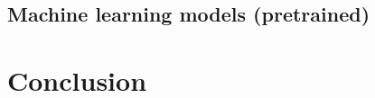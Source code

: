 \documentclass[conference]{IEEEtran}
\begin{document}
\subsection{Machine learning models (pretrained)}\label{subsec:machine-learning}


%
%
%
%
%
%
%
%
%
%

\section{Conclusion}\label{sec:conclusion}



\end{document}
